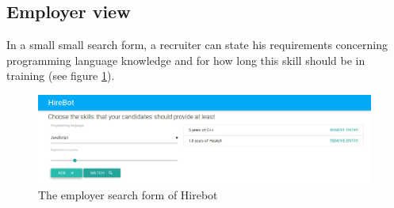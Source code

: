 \subsection{Employer view}
In a small small search form, a recruiter can state his requirements concerning
programming language knowledge and for how long this skill should be in training (see figure \ref{fig:employerview}).

\begin{figure}
  \includegraphics[width=30em]{gfx/employerview.png}
  \caption{The employer search form of Hirebot}
  \label{fig:employerview}
\end{figure}
